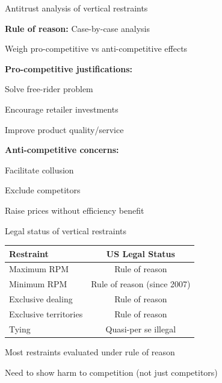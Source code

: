 \documentclass[notes,11pt, aspectratio=169]{beamer}
\newenvironment{wideitemize}{\itemize\addtolength{\itemsep}{10pt}}{\enditemize}
\begin{document}
\begin{frame}{Antitrust analysis of vertical restraints}
	\begin{wideitemize}
		\item \textbf{Rule of reason:} Case-by-case analysis
		\begin{wideitemize}
			\vspace{5pt}
			\item Weigh pro-competitive vs anti-competitive effects
		\end{wideitemize}
		\item \textbf{Pro-competitive justifications:}
		\begin{wideitemize}
			\vspace{5pt}
			\item Solve free-rider problem
			\item Encourage retailer investments
			\item Improve product quality/service
		\end{wideitemize}
		\item \textbf{Anti-competitive concerns:}
		\begin{wideitemize}
			\vspace{5pt}
			\item Facilitate collusion
			\item Exclude competitors
			\item Raise prices without efficiency benefit
		\end{wideitemize}
	\end{wideitemize}
\end{frame}

\begin{frame}{Legal status of vertical restraints}
	\begin{center}
		\begin{tabular}{|l|c|}
			\hline
			\textbf{Restraint} & \textbf{US Legal Status} \\
			\hline
			Maximum RPM & Rule of reason \\
			Minimum RPM & Rule of reason (since 2007) \\
			Exclusive dealing & Rule of reason \\
			Exclusive territories & Rule of reason \\
			Tying & Quasi-per se illegal \\
			\hline
		\end{tabular}
	\end{center}
	\vspace{10pt}
	\begin{wideitemize}
		\item Most restraints evaluated under rule of reason
		\item Need to show harm to competition (not just competitors)
	\end{wideitemize}
\end{frame}
\end{document}
